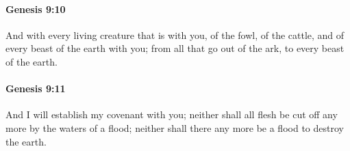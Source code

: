 		\paragraph{Genesis 9:10} %
			\label{GENESIS-9-10}

			And with every living creature that is with you, of the fowl, of the cattle, and of every beast of the earth with you; from all that go out of the ark, to every beast of the earth.


		\paragraph{Genesis 9:11} %
			\label{GENESIS-9-11}

			And I will establish my covenant with you; neither shall all flesh be cut off any more by the waters of a flood; neither shall there any more be a flood to destroy the earth.


